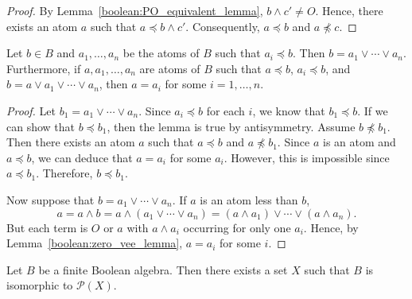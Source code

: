  
\begin{proof}
By  Lemma~\ref{boolean:PO_equivalent_lemma}, $b \wedge c' \neq O$. Hence, there exists an
atom $a$ such that $a \preceq b \wedge c'$. Consequently, $a \preceq
b$ and $a \not\preceq c$.
\end{proof}
 
 
\begin{lemma}\label{boolean:atoms_lemma}
Let $b \in B$ and $a_1, \ldots, a_n$ be the atoms of $B$ such that
$a_i \preceq b$. Then $b = a_1 \vee \cdots \vee a_n$. Furthermore, if
$a, a_1, \ldots, a_n$ are atoms of $B$ such that $a \preceq b$, $a_i
\preceq b$, and $b = a \vee a_1 \vee \cdots \vee a_n$, then $a = a_i$
for some $i = 1, \ldots, n$.    
\end{lemma} 
 
 
\begin{proof}
Let $b_1 =   a_1 \vee \cdots \vee a_n$. Since $a_i \preceq b$ for each
$i$, we know that $b_1 \preceq b$.  If we can show that $b \preceq
b_1$, then the lemma is true by antisymmetry.  Assume $b \not\preceq
b_1$. Then there exists an atom $a$ such that $a \preceq b$ and $a
\not\preceq b_1$.  Since $a$ is an atom and $a \preceq b$, we can
deduce that $a = a_i$ for  some $a_i$. However, this is impossible
since $a \preceq b_1$. Therefore, $b \preceq b_1$. 
 
 
Now suppose that $b = a_1 \vee \cdots \vee a_n$. If $a$ is an atom
less than $b$, 
\[
a 
= a \wedge b 
= a \wedge( a_1 \vee \cdots \vee a_n ) 
= (a \wedge a_1) \vee \cdots \vee ( a \wedge a_n ).
\]
But each term is $O$ or $a$ with $a \wedge a_i$ occurring for only one
$a_i$. Hence, by Lemma~\ref{boolean:zero_vee_lemma}, $a = a_i$ for some $i$.
\end{proof}
 
 
\begin{theorem}\label{boolean:classification_boolean_algebra}
Let $B$ be a finite Boolean algebra.  Then there exists a set $X$ such
that $B$ is isomorphic to ${\mathcal P}(X)$. 
\end{theorem} 
 
